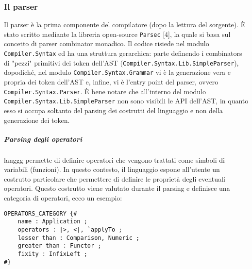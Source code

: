 \documentclass[10pt,a4paper]{article}
\begin{document}
\subsubsection{Il parser}
Il parser è la prima componente del compilatore (dopo la lettura del sorgente). \`E stato scritto mediante la libreria
open-source \texttt{Parsec} [4], la quale si basa sul concetto di parser combinator monadico. Il codice risiede nel
modulo \texttt{Compiler.Syntax} ed ha una struttura gerarchica: parte definendo i combinators di "pezzi" primitivi dei
token dell'AST (\texttt{Compiler.Syntax.Lib.SimpleParser}), dopodiché, nel modulo \texttt{Compiler.Syntax.Grammar} vi
è la generazione vera e propria dei token dell'AST e, infine, vi è l'entry point del parser, ovvero
\texttt{Compiler.Syntax.Parser}. \`E bene notare che all'interno del modulo \texttt{Compiler.Syntax.Lib.SimpleParser}
non sono visibili le API dell'AST, in quanto esso si occupa soltanto del parsing dei costrutti del linguaggio e non
della generazione dei token.

\subparagraph{Parsing degli operatori}
langgg permette di definire operatori che vengono trattati come simboli di variabili (funzioni). In questo contesto,
il linguaggio espone all'utente un costrutto particolare che permettere di definire le proprietà degli eventuali
operatori. Questo costrutto viene valutato durante il parsing e definisce una categoria di operatori, ecco un esempio:

\begin{lstlisting}
OPERATORS_CATEGORY {#
    name : Application ;
    operators : |>, <|, `applyTo ;
    lesser than : Comparison, Numeric ;
    greater than : Functor ;
    fixity : InfixLeft ;
#}
\end{lstlisting}
\end{document}
